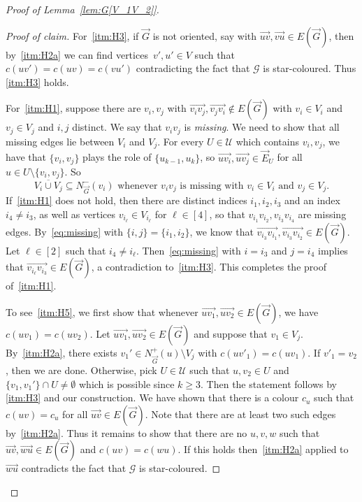 \documentclass[a4paper, 12pt]{article}
\numberwithin{equation}{section}
\newenvironment{proofclaim}[1][Proof of claim]{\begin{proof}[#1]\renewcommand*{\qedsymbol}{\(\blacksquare\)}}{\end{proof}}
\def\sm{{\setminus}}
\newcommand{\ova}[1]{\overrightarrow{#1}}
\newcommand{\mc}[1]{\mathcal{#1}}
\newcommand{\ms}[1]{\mathscr{#1}}
\begin{document}
\begin{proof}[Proof of Lemma~\ref{lem:G[V_1V_2]}]
\begin{proofclaim}
For~\ref{itm:H3}, if $\ova{G}$ is not oriented, say with $\ova{uv}, \ova{vu} \in E(\ova{G})$, then by~\ref{itm:H2a} we can find vertices~$v',u' \in V$ such that $c(uv') = c(uv) = c(vu')$ contradicting the fact that $\ms{G}$ is star-coloured. 
Thus \ref{itm:H3} holds. 

For~\ref{itm:H1}, suppose there are $v_i,v_j$ with $\ova{v_iv_j},\ova{v_jv_i} \notin E(\ova{G})$ with $v_i \in V_i$ and $v_j \in V_j$ and $i,j$ distinct.
We say that $v_iv_j$ is \emph{missing}.
We need to show that all missing edges lie between $V_i$ and $V_j$.
For every $U \in \mc{U}$ which contains $v_i,v_j$, we have that $\{v_i,v_j\}$ 
plays the role of $\{u_{k-1},u_k\}$, so $\ova{uv_i},\ova{uv_j} \in \ova{E}_U$  
for all $u \in U \sm \{v_i,v_j\}$.
So
\begin{equation}\label{eq:missing}
\overline{V_i \cup V_j} \subseteq N^-_{\ova{G}}(v_i)
\text{ whenever }v_iv_j\text{ is missing with }v_i \in V_i\text{ and }v_j \in V_j.
\end{equation}
If~\ref{itm:H1} does not hold, then there are distinct indices $i_1, i_2, i_3$ and an index $i_4\neq i_3$, as well as  vertices $v_{i_\ell}\in V_{i_\ell}$  for $\ell \in [4]$, so that $v_{i_1}v_{i_2}, v_{i_3}v_{i_4}$ are  missing edges. 
By~\eqref{eq:missing} with $\{i,j\}=\{i_1,i_2\}$, we know that $\ova{v_{i_3}v_{i_1}}, \ova{v_{i_3}v_{i_2}}\in E(\ova G)$. Let $\ell\in[2]$ such that $i_4\neq i_\ell$. Then~\eqref{eq:missing}  with $i=i_3$ and $j=i_4$ implies that $\ova{v_{i_\ell}v_{i_3}}\in E(\ova G)$, a contradiction to~\ref{itm:H3}.
 This completes the proof of~\ref{itm:H1}.

To see~\ref{itm:H5}, we first show that
whenever $\ova{uv_1}, \ova{uv_2} \in E(\ova{G})$, we have $c(uv_1) = c(uv_2)$.
Let $\ova{uv_1},\ova{uv_2} \in E(\ova{G})$ and suppose that $v_1 \in V_j$.
By~\ref{itm:H2a}, there exists $v_1' \in N^+_{\ova{G}}(u) \setminus V_j$ with $c(uv'_1) = c(uv_1)$.
If $v'_1 = v_2$, then we are done. 
Otherwise, pick $U \in \mathcal{U}$ such that $u,v_2 \in U$ and $\{v_1,v_1'\} \cap U \ne \emptyset$ 
which is possible since $k \geq 3$.
Then the statement follows by \ref{itm:H3} and our construction.
We have shown that there is a colour $c_u$ such that $c(uv)=c_u$ for all $\ova{uv} \in E(\ova{G})$. Note that there are at least two such edges by~\ref{itm:H2a}. Thus
it remains to show that there are no $u,v,w$ such that $\ova{uv},\ova{wu} \in E(\ova{G})$ and $c(uv)=c(wu)$.
If this holds then~\ref{itm:H2a} applied to $\ova{wu}$ contradicts the fact that $\ms{G}$ is star-coloured.


\end{proofclaim}
\end{proof}
\end{document}
